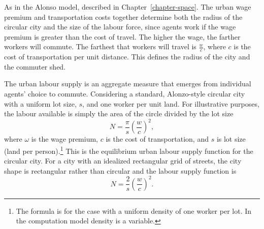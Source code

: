 
As in the Alonso model, described in Chapter~\ref{chapter-space}. The \gls{urban wage premium} and transportation costs together determine both the radius of the circular city and the size of the labour force, %
since agents work if the wage premium is greater than the cost of travel. %
The higher the wage, the farther workers will commute. %
The farthest that workers will travel is $\frac{w}{{c}}$, where ${c}$ is the cost of transportation per unit distance. This defines the radius of the city and the commuter shed.

The \gls{urban labour supply} is an \gls{aggregate} measure that emerges from individual agents' choice to commute. Considering a standard, Alonzo-style \gls{circular city} with a uniform lot size, $s$, and  one worker per unit land. For illustrative purposes, the labour available is simply the area of the circle divided by the lot size 
\begin{equation}
 N = \frac{\pi}{s} \left(\frac{w}{{c}}\right)^2,
\label{eqn-labour-supply1}
\end{equation}
where $\omega$ is the wage premium, $c$ is the cost of transportation, and $s$ is lot size (land per person).\footnote{The formula is for the case with a uniform density of one worker per lot. In the computation model density is a variable.} This is the equilibrium \gls{urban labour supply} function for the circular city. For a city with an idealized rectangular grid of streets, the city shape is rectangular rather than circular and the labour supply function is \[N= \frac{2}{s}\left(\frac{w}{{c}}\right)^2.\] %

